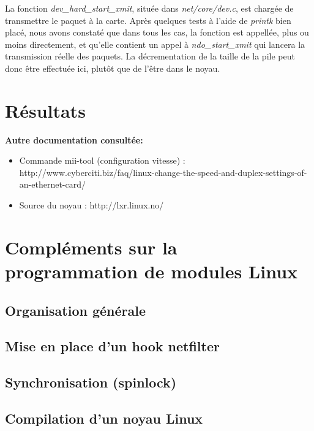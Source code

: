 \documentclass[a4paper]{article}
\begin{document}
La fonction \textit{dev\_hard\_start\_xmit}, située dans
\textit{net/core/dev.c}, est chargée de transmettre le paquet
à la carte. Après quelques tests à l'aide de \textit{printk} bien
placé, nous avons constaté que dans tous les cas, la fonction
est appellée, plus ou moins directement, et qu'elle contient 
un appel à \textit{ndo\_start\_xmit} qui lancera la transmission réelle des paquets. La décrementation de la
taille de la pile peut donc être effectuée ici, plutôt que de
l'être dans le noyau.

\section{Résultats}

\newpage



\textbf{Autre documentation consultée:}
\begin{itemize}
	\item Commande mii-tool (configuration vitesse) : 
	http://www.cyberciti.biz/faq/linux-change-the-speed-and-duplex-settings-of-an-ethernet-card/
	\item Source du noyau : http://lxr.linux.no/
\end{itemize}


\newpage
\appendix

\section{Compléments sur la programmation de modules Linux}
\subsection{Organisation générale}
\subsection{Mise en place d'un hook netfilter}
\subsection{Synchronisation (spinlock)}
\subsection{Compilation d'un noyau Linux}
\end{document}
